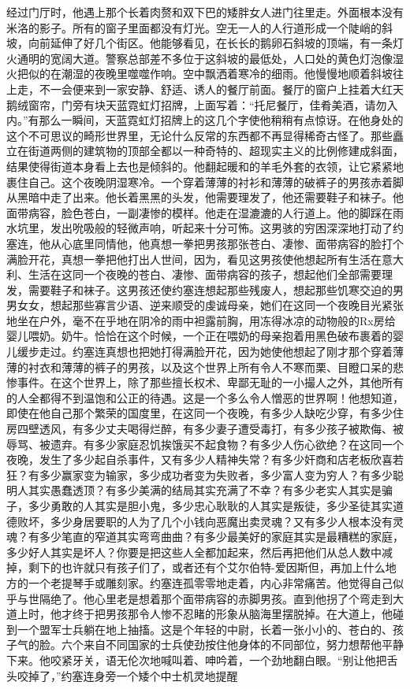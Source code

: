     经过门厅时，他遇上那个长着肉赘和双下巴的矮胖女人进门往里走。外面根本没有米洛的影子。所有的窗子里面都没有灯光。空无一人的人行道形成一个陡峭的斜坡，向前延伸了好几个街区。他能够看见，在长长的鹅卵石斜坡的顶端，有一条灯火通明的宽阔大道。警察总部差不多位于这斜坡的最低处，人口处的黄色灯泡像湿火把似的在潮湿的夜晚里噬噬作响。空中飘洒着寒冷的细雨。他慢慢地顺着斜坡往上走，不一会便来到一家安静、舒适、诱人的餐厅前面。餐厅的窗户上挂着大红天鹅绒窗帘，门旁有块天蓝霓虹灯招牌，上面写着：“托尼餐厅，佳肴美酒，请勿入内。”有那么一瞬间，天蓝霓虹灯招牌上的这几个字使他稍稍有点惊讶。在他身处的这个不可思议的畸形世界里，无论什么反常的东西都不再显得稀奇古怪了。那些矗立在街道两侧的建筑物的顶部全都以一种奇特的、超现实主义的比例修建成斜面，结果使得街道本身看上去也是倾斜的。他翻起暖和的羊毛外套的衣领，让它紧紧地裹住自己。这个夜晚阴湿寒冷。一个穿着薄薄的衬衫和薄薄的破裤子的男孩赤着脚从黑暗中走了出来。他长着黑黑的头发，他需要理发了，他还需要鞋子和袜子。他面带病容，脸色苍白，一副凄惨的模样。他走在湿漉漉的人行道上。他的脚踩在雨水坑里，发出吮吸般的轻微声响，听起来十分可怖。这男骇的穷困深深地打动了约塞连，他从心底里同情他，他真想一拳把男孩那张苍白、凄惨、面带病容的脸打个满脸开花，真想一拳把他打出人世间，因为，看见这男孩使他想起所有生活在意大利、生活在这同一个夜晚的苍白、凄惨、面带病容的孩子，想起他们全部需要理发，需要鞋子和袜子。这男孩还使约塞连想起那些残废人，想起那些饥寒交迫的男男女女，想起那些寡言少语、逆来顺受的虔诚母亲，她们在这同一个夜晚目光紧张地坐在户外，毫不在乎地在阴冷的雨中袒露前胸，用冻得冰凉的动物般的Rx房给婴儿喂奶。奶牛。恰恰在这个时候，一个正在喂奶的母亲抱着用黑色破布裹着的婴儿缓步走过。约塞连真想也把她打得满脸开花，因为她使他想起了刚才那个穿着薄薄的衬衣和薄薄的裤子的男孩，以及这个世界上所有令人不寒而栗、目瞪口呆的悲惨事件。在这个世界上，除了那些擅长权术、卑鄙无耻的一小撮人之外，其他所有的人全都得不到温饱和公正的待遇。这是一个多么令人憎恶的世界啊！他想知道，即使在他自己那个繁荣的国度里，在这同一个夜晚，有多少人缺吃少穿，有多少住房四壁透风，有多少丈夫喝得烂醉，有多少妻子遭受毒打，有多少孩子被欺侮、被辱骂、被遗弃。有多少家庭忍饥挨饿买不起食物？有多少人伤心欲绝？在这同一个夜晚，发生了多少起自杀事件，又有多少人精神失常？有多少奸商和店老板欣喜若狂？有多少赢家变为输家，多少成功者变为失败者，多少富人变为穷人？有多少聪明人其实愚蠢透顶？有多少美满的结局其实充满了不幸？有多少老实人其实是骗子，多少勇敢的人其实是胆小鬼，多少忠心耿耿的人其实是叛徒，多少圣徒其实道德败坏，多少身居要职的人为了几个小钱向恶魔出卖灵魂？又有多少人根本没有灵魂？有多少笔直的窄道其实弯弯曲曲？有多少最美好的家庭其实是最糟糕的家庭，多少好人其实是坏人？你要是把这些人全都加起来，然后再把他们从总人数中减掉，剩下的也许就只有孩子们了，或者还有个艾尔伯特-爱因斯但，再加上什么地方的一个老提琴手或雕刻家。约塞连孤零零地走着，内心非常痛苦。他觉得自己似乎与世隔绝了。他心里老是想着那个面带病容的赤脚男孩。直到他拐了个弯走到大道上时，他才终于把男孩那令人惨不忍睹的形象从脑海里摆脱掉。在大道上，他碰到一个盟军士兵躺在地上抽搐。这是个年轻的中尉，长着一张小小的、苍白的、孩子气的脸。六个来自不同国家的士兵使劲按住他身体的不同部位，努力想帮他平静下来。他咬紧牙关，语无伦次地喊叫着、呻吟着，一个劲地翻白眼。“别让他把舌头咬掉了，”约塞连身旁一个矮个中士机灵地提醒